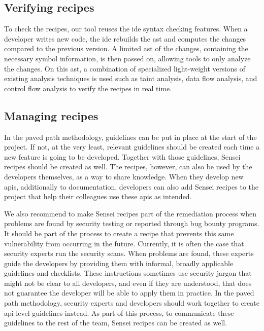 \subsection{Verifying recipes}
To check the recipes, our tool reuses the \gls{ide} syntax checking features.
When a developer writes new code, the \gls{ide} rebuilds the \gls{ast} and computes the changes compared to the previous version.
A limited \gls{ast} of the changes, containing the necessary symbol information, is then passed on, allowing tools to only analyze the changes.
On this \gls{ast}, a combination of specialized light-weight versions of existing analysis techniques is used such as taint analysis, data flow analysis, and control flow analysis to verify the recipes in real time.

\subsection{Managing recipes}
\label{sec:manager}
In the paved path methodology, guidelines can be put in place at the start of the project.
If not, at the very least, relevant guidelines should be created each time a new feature is going to be developed.
Together with those guidelines, Sensei recipes should be created as well.
The recipes, however, can also be used by the developers themselves, as a way to share knowledge.
When they develop new \glspl{api}, additionally to documentation, developers can also add Sensei recipes to the project that help their colleagues use these \glspl{api} as intended.

We also recommend to make Sensei recipes part of the remediation process when problems are found by security testing or reported through bug bounty programs.
It should be part of the process to create a recipe that prevents this same vulnerability from occurring in the future.
Currently, it is often the case that security experts run the security scans.
When problems are found, these experts guide the developers by providing them with informal, broadly applicable guidelines and checklists.
These instructions sometimes use security jargon that might not be clear to all developers, and even if they are understood, that does not guarantee the developer will be able to apply them in practice.
In the paved path methodology, security experts and developers should work together to create \gls{api}-level guidelines instead.
As part of this process, to communicate these guidelines to the rest of the team, Sensei recipes can be created as well.

